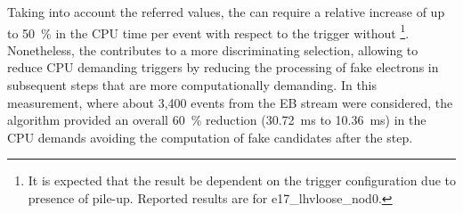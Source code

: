 Taking into account the referred values, the \rnn{} can require a
relative increase of up to \SI{50}{\%} in the \fastcalo{} CPU time per event
with respect to the trigger without \rnn{}\footnote{It is expected that the result be dependent on the trigger configuration due to presence of pile-up. Reported results are for e17\_lhvloose\_nod0.}. Nonetheless, the \rnn{} contributes to a more discriminating selection, allowing to reduce CPU demanding triggers by reducing the processing of fake electrons in subsequent steps that are more computationally demanding. In this measurement, where about 3,400 events from the EB stream were considered, the \rnn{} algorithm provided an overall
\SI{60}{\%} reduction (\SI{30.72}{\milli\second} to \SI{10.36}{\milli\second})
in the CPU demands avoiding the computation of fake candidates after the \fastcalo step. 





